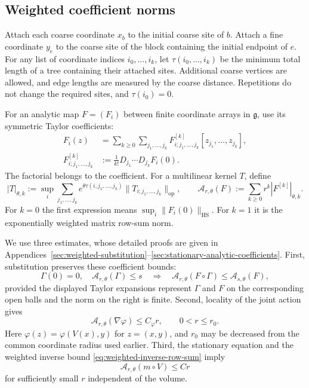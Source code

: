 \documentclass[10pt,reqno]{amsart}
\theoremstyle{definition}
\theoremstyle{remark}
\numberwithin{equation}{section}
\numberwithin{figure}{section}
\newcommand{\g}{\mathfrak g}
\begin{document}
\subsection{Weighted coefficient norms}
Attach each coarse coordinate $x_b$ to the initial coarse site of
$b$. Attach a fine coordinate $y_e$ to the coarse site of the block
containing the initial endpoint of $e$. For any list of coordinate
indices $i_0,\ldots,i_k$, let $\tau(i_0,\ldots,i_k)$ be the minimum
total length of a tree containing their attached sites. Additional
coarse vertices are allowed, and edge lengths are measured by the
coarse distance. Repetitions do not change the required sites, and
$\tau(i_0)=0$.

For an analytic map $F=(F_i)$ between finite coordinate arrays in
$\g$, use its symmetric Taylor coefficients:
\begin{equation}\label{eq:analytic-map-coefficients}
\begin{aligned}
F_i(z)&=\sum_{k\ge0}\sum_{j_1,\ldots,j_k}
F^{[k]}_{i;j_1,\ldots,j_k}[z_{j_1},\ldots,z_{j_k}],\\
F^{[k]}_{i;j_1,\ldots,j_k}
&:=\frac1{k!}D_{j_1}\cdots D_{j_k}F_i(0).
\end{aligned}
\end{equation}
The factorial belongs to the coefficient. For a multilinear kernel
$T$, define
\begin{equation}\label{eq:weighted-kernel-norm}
|T|_{\theta,k}:=\sup_i\sum_{j_1,\ldots,j_k}
e^{\theta\tau(i,j_1,\ldots,j_k)}
\|T_{i;j_1,\ldots,j_k}\|_{\mathrm{op}},\qquad
\mathcal A_{r,\theta}(F):=\sum_{k\ge0}r^k|F^{[k]}|_{\theta,k}.
\end{equation}
For $k=0$ the first expression means $\sup_i\|F_i(0)\|_{\mathrm{HS}}$.
For $k=1$ it is the exponentially weighted matrix row-sum norm.

We use three estimates, whose detailed proofs are given in
Appendices~\ref{sec:weighted-substitution}--\ref{sec:stationary-analytic-coefficients}.
First, substitution preserves these coefficient bounds:
\begin{equation}\label{eq:weighted-substitution-summary}
\Gamma(0)=0,\quad\mathcal A_{r,\theta}(\Gamma)\le s
\quad\Longrightarrow\quad
\mathcal A_{r,\theta}(F\circ\Gamma)\le\mathcal A_{s,\theta}(F),
\end{equation}
provided the displayed Taylor expansions represent $\Gamma$ and $F$
on the corresponding open balls and the norm on the right is finite.
Second, locality of the joint action gives
\begin{equation}\label{eq:joint-gradient-analytic-summary}
\mathcal A_{r,\theta}(\nabla\varphi)\le C_\varphi r,
\qquad 0<r\le r_0.
\end{equation}
Here $\varphi(z)=\varphi(V(x),y)$ for $z=(x,y)$, and $r_0$ may be
decreased from the common coordinate radius used earlier.
Third, the stationary equation and the weighted inverse bound
\eqref{eq:weighted-inverse-row-sum} imply
\begin{equation}\label{eq:stationary-analytic-summary}
\mathcal A_{r,\theta}(m\circ V)\le Cr
\end{equation}
for sufficiently small $r$ independent of the volume.
\end{document}
